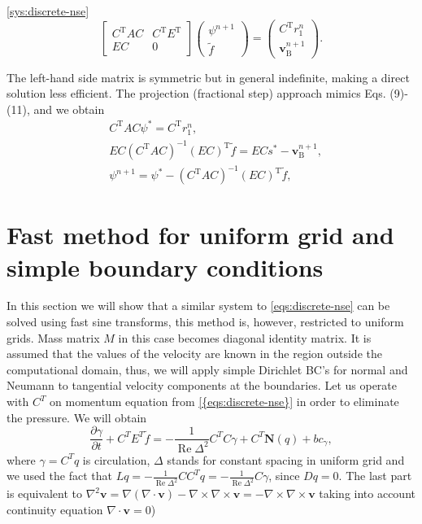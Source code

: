 \documentclass{article}
\numberwithin{equation}{section}
\begin{document}
	\cref{sys:discrete-nse} 
\begin{equation}
\left[\begin{array}{cc}
C^{\mathrm{T}} A C & C^{\mathrm{T}} E^{\mathrm{T}} \\
E C & 0
\end{array}\right]\left(\begin{array}{c}
\psi^{n+1} \\
\tilde{f}
\end{array}\right)=\left(\begin{array}{c}
C^{\mathrm{T}} r_1^n \\
\boldsymbol{v}_{\mathrm{B}}^{n+1}
\end{array}\right) .
\end{equation}

The left-hand side matrix is symmetric but in general indefinite, making a direct solution less efficient. The projection (fractional step) approach mimics Eqs. (9)-(11), and we obtain
\begin{equation}
  \begin{aligned}
& C^{\mathrm{T}} A C \psi^*=C^{\mathrm{T}} r_1^n, \\
& E C\left(C^{\mathrm{T}} A C\right)^{-1}(E C)^{\mathrm{T}} \tilde{f}=E C s^*-\boldsymbol{v}_{\mathrm{B}}^{n+1}, \\
& \psi^{n+1}=\psi^*-\left(C^{\mathrm{T}} A C\right)^{-1}(E C)^{\mathrm{T}} \tilde{f},
\end{aligned}
\end{equation}

	
\section{Fast method for uniform grid and simple boundary conditions}\label{sec:fast-method}

In this section we will show that a similar system to \cref{eqs:discrete-nse} can be solved using fast sine transforms, this method is, however, restricted to uniform grids. Mass matrix $M$ in this case becomes diagonal identity matrix. It is assumed that the values of the velocity are known in the region outside the computational domain, thus, we will apply simple Dirichlet BC's for normal and Neumann to tangential velocity components at the boundaries. Let us operate with $C^T$ on momentum equation from \cref{{eqs:discrete-nse}} in order to eliminate the pressure. We will obtain 
\begin{equation}
	\frac{\partial \gamma}{\partial t} + C^TE^T\tilde{f} = -\frac{1}{\operatorname{Re} \Delta ^2} C^TC\gamma + C^T \mathbf{N}(q)+ bc_{\gamma},
\end{equation}
where $\gamma=C^Tq$ is circulation, $\Delta$ stands for constant spacing in uniform grid and we used the fact that $Lq=-\frac{1}{\operatorname{Re}\Delta ^2} CC^Tq=-\frac{1}{\operatorname{Re}\Delta ^2} C\gamma$, since $Dq=0$. The last part is equivalent to $\nabla^2\boldsymbol{v}=\nabla(\nabla\cdot\boldsymbol{v})-\nabla\times\nabla\times\boldsymbol{v}=-\nabla\times\nabla\times\boldsymbol{v}$ taking into account continuity equation $\nabla\cdot\boldsymbol{v}=0$)
\end{document}
